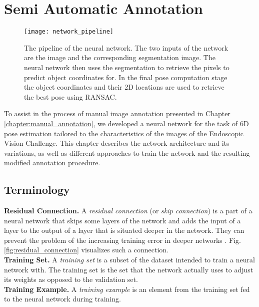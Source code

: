 \chapter{Semi Automatic Annotation} \label{chapter:semi_automatic}

\begin{figure}[!tbp]
	\centering
    \texttt{[image: network\_pipeline]}
    \caption{The pipeline of the neural network. The two inputs of the network are the image and the corresponding segmentation image. The neural network then uses the segmentation to retrieve the pixels to predict object coordinates for. In the final pose computation stage the object coordinates and their 2D locations are used to retrieve the best pose using RANSAC.}
    	\label{fig:network_pipeline}
\end{figure} 

To assist in the process of manual image annotation presented in Chapter \ref{chapter:manual_annotation}, we developed a neural network for the task of 6D pose estimation tailored to the characteristics of the images of the Endoscopic Vision Challenge. This chapter describes the network architecture and its variations, as well as different approaches to train the network and the resulting modified annotation procedure.

\section{Terminology} \label{section:network_terminology}

\noindent\textbf{Residual Connection.} A \textit{residual connection} (or \textit{skip connection}) is a part of a neural network that skips some layers of the network and adds the input of a layer to the output of a layer that is situated deeper in the network. They can prevent the problem of the increasing training error in deeper networks \cite{resnet}. Fig. \ref{fig:residual_connection} visualizes such a connection. \\

\noindent\textbf{Training Set.} A \textit{training set} is a subset of the dataset intended to train a neural network with. The training set is the set that the network actually uses to adjust its weights as opposed to the validation set. \\

\noindent\textbf{Training Example.} A \textit{training example} is an element from the training set fed to the neural network during training. \\

